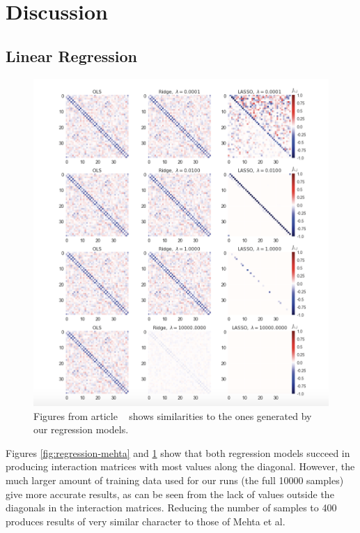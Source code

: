 \section{Discussion}
\subsection{Linear Regression}
\begin{figure}[H]
    \centering
\includegraphics[width = 0.7\paperwidth]{figures/Regression_metha_article.png} 
\caption{Figures from article ~\cite{HighBias} shows similarities to the ones generated by our regression models.} 
\label{fig:regression-mehta-article}
\end{figure}
Figures \ref{fig:regression-mehta} and \ref{fig:regression-mehta-article}
show that both regression models succeed in producing interaction matrices
with most values along the diagonal. 
However, the much larger amount of training data used for our runs 
(the full 10000 samples) give more accurate results, 
as can be seen from the lack of values outside the 
diagonals in the interaction matrices. Reducing the number of samples to 400
produces results of very similar character to those of Mehta et al.

